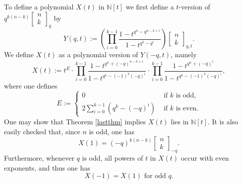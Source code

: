 \documentclass[10pt]{amsart}
\theoremstyle{plain}
\theoremstyle{definition}
\theoremstyle{remark}
\numberwithin{equation}{section}
\newcommand\qbin[3]{\left[\begin{matrix} #1 \\ #2 \end{matrix} \right]_{#3}}
\newcommand\NN{\mathbb{N}}
\begin{document}
To define a polynomial $X(t)$ in $\NN[t]$ we first define a 
$t$-version of $q^{k(n-k)}\qbin{n}{k}{q}$ by
$$
Y(q,t):=\left( \prod_{i=0}^{k-1}\frac{1-t^{q^n-q^{n-k+i}}}{1-t^{q^k-q^{i}}} \right)
\qbin{n}{k}{q,t}.
$$
We define $X(t)$ as a polynomial version of $Y(-q,t)$, namely
$$
X(t):=t^E \cdot 
\prod_{i=0}^{k-1}\frac{1-t^{q^n+(-q)^{n-k+i}}}{1-t^{q^k-(-1)^k(-q)^{i}}}
\cdot 
\prod_{i=0}^{k-1}\frac{1-t^{q^n+(-q)^{i}}}{1-t^{q^k-(-1)^k(-q)^{i}}},
$$
where one defines
$$
E:=\begin{cases}
0 &{\text{ if $k$ is odd,}}\\
2\sum_{i=0}^{k-1} (q^k-(-q)^i)& {\text{ if $k$ is even.}}
\end{cases}
$$
One may show that Theorem \ref{lastthm} implies $X(t)$ lies in $\NN[t]$. 
It is also easily checked that, since $n$ is odd, one has
\begin{equation}
\label{negative-(q,t)-bin-evaluates-right-at-1}
X(1)= (-q)^{k(n-k)}\qbin{n}{k}{-q}.
\end{equation}
Furthermore, whenever $q$ is odd, all powers of $t$ in
$X(t)$ occur with even exponents, and thus one has
\begin{equation}
\label{negative-(q,t)-bin-evaluates-right-at-(-1)}
X(-1)=X(1) \text{ for odd }q.
\end{equation}
\end{document}
